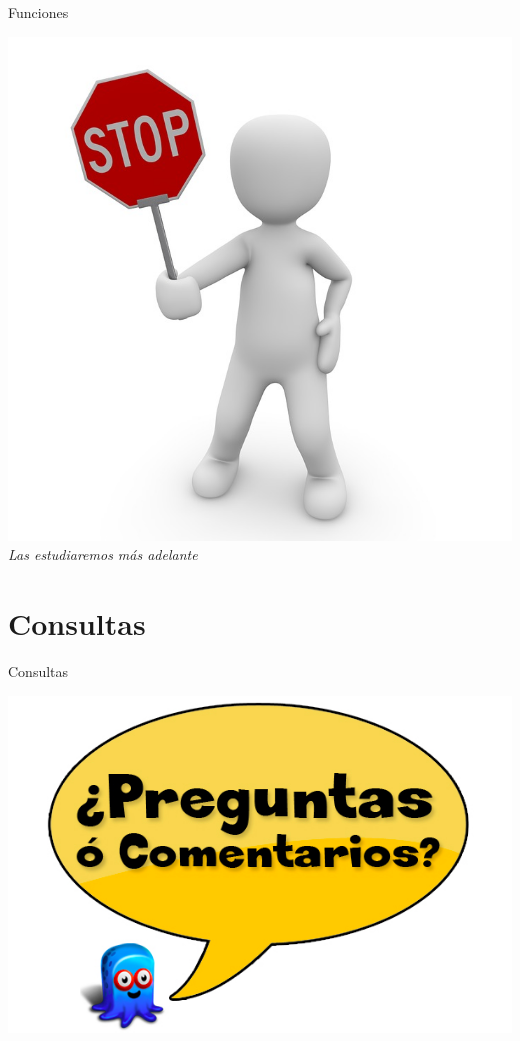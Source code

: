 \documentclass{bredelebeamer}
\begin{document}
\begin{frame}{Funciones}
\begin{center}
\includegraphics[scale=0.2]{images/stop.jpg}
\\\textit{Las estudiaremos más adelante}
\end{center}
\end{frame}




\section{Consultas}
\begin{frame}{Consultas}
\begin{center}
\includegraphics[scale=0.3]{images/consultas.png}
\end{center}
\end{frame}
\end{document}
